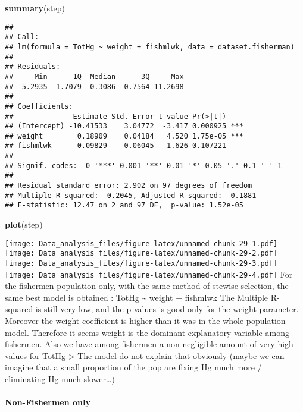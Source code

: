 \documentclass[12pt,]{article}
\newenvironment{Shaded}{\begin{snugshade}}{\end{snugshade}}
\newcommand{\KeywordTok}[1]{\textcolor[rgb]{0.13,0.29,0.53}{\textbf{#1}}}
\newcommand{\NormalTok}[1]{#1}
\let\oldparagraph\paragraph
\renewcommand{\paragraph}[1]{\oldparagraph{#1}\mbox{}}
\begin{document}
\begin{Shaded}
\begin{Highlighting}[]
\KeywordTok{summary}\NormalTok{(step)}
\end{Highlighting}
\end{Shaded}

\begin{verbatim}
## 
## Call:
## lm(formula = TotHg ~ weight + fishmlwk, data = dataset.fisherman)
## 
## Residuals:
##     Min      1Q  Median      3Q     Max 
## -5.2935 -1.7079 -0.3086  0.7564 11.2698 
## 
## Coefficients:
##              Estimate Std. Error t value Pr(>|t|)    
## (Intercept) -10.41533    3.04772  -3.417 0.000925 ***
## weight        0.18909    0.04184   4.520 1.75e-05 ***
## fishmlwk      0.09829    0.06045   1.626 0.107221    
## ---
## Signif. codes:  0 '***' 0.001 '**' 0.01 '*' 0.05 '.' 0.1 ' ' 1
## 
## Residual standard error: 2.902 on 97 degrees of freedom
## Multiple R-squared:  0.2045, Adjusted R-squared:  0.1881 
## F-statistic: 12.47 on 2 and 97 DF,  p-value: 1.52e-05
\end{verbatim}

\begin{Shaded}
\begin{Highlighting}[]
\KeywordTok{plot}\NormalTok{(step)}
\end{Highlighting}
\end{Shaded}

\texttt{[image: Data\_analysis\_files/figure-latex/unnamed-chunk-29-1.pdf]}
\texttt{[image: Data\_analysis\_files/figure-latex/unnamed-chunk-29-2.pdf]}
\texttt{[image: Data\_analysis\_files/figure-latex/unnamed-chunk-29-3.pdf]}
\texttt{[image: Data\_analysis\_files/figure-latex/unnamed-chunk-29-4.pdf]}
For the fishermen population only, with the same method of stewise
selection, the same best model is obtained : TotHg \textasciitilde{}
weight + fishmlwk The Multiple R-squared is still very low, and the
p-values is good only for the weight parameter. Moreover the weight
coefficient is higher than it was in the whole population model.
Therefore it seems weight is the dominant explanatory variable among
fishermen. Also we have among fishermen a non-negligible amount of very
high values for TotHg \textgreater{} The model do not explain that
obviously (maybe we can imagine that a small proportion of the pop are
fixing Hg much more / eliminating Hg much slower\ldots{})

\paragraph{Non-Fishermen only}\label{non-fishermen-only}
\end{document}

